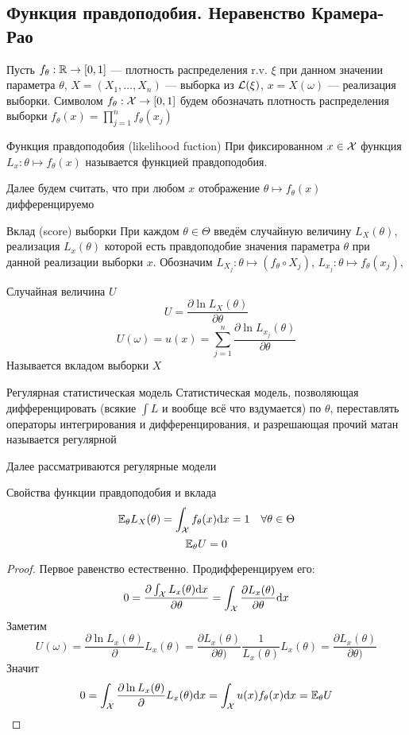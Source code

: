 \subsection{Функция правдоподобия. Неравенство Крамера-Рао}

Пусть $f_\theta:\mathbb R\to\left[{0, 1}\right]$ --- плотность распределения r.v. $\xi$
при данном значении параметра $\theta$,
$X = (X_1, \dotsc, X_n)$ --- выборка из $\mathcal L(\xi)$,
$x = X(\omega)$ --- реализация выборки.
Символом $f_\theta:\mathcal X\to\left[{0, 1}\right]$
будем обозначать плотность распределения выборки
$f_\theta(x) = \prod_{j=1}^n f_\theta(x_j)$

\begin{dfn}{Функция правдоподобия (likelihood fuction)}
При фиксированном $x\in\mathcal X$
функция $L_x: \theta\mapsto f_\theta(x)$ называется функцией правдоподобия.

Далее будем считать,
что при любом $x$
отображение $\theta\mapsto f_\theta(x)$ дифференцируемо
\end{dfn}

\begin{dfn}{Вклад (score) выборки}
При каждом $\theta\in\Theta$
введём случайную величину $L_X(\theta)$,
реализация $L_x(\theta)$ которой
есть правдоподобие значения параметра $\theta$ при данной реализации выборки $x$.
Обозначим
 ${L_{X_j}: \theta\mapsto (f_\theta\circ X_j)}$,
 ${L_{x_j}: \theta\mapsto f_\theta(x_j)}$,

Случайная величина $U$
$$U = \frac{\partial \ln L_X(\theta)}{\partial\theta}$$
$$U(\omega)
= u(x) = \sum_{j=1}^n{\frac{\partial \ln L_{x_j}(\theta)}{\partial\theta}}$$
Называется вкладом выборки $X$
\end{dfn}

\begin{dfn}{Регулярная статистическая модель}
Статистическая модель,
позволяющая
дифференцировать (всякие $\int L$ и вообще всё что вздумается) по $\theta$,
переставлять операторы интегрирования и дифференцирования,
и разрешающая прочий матан называется регулярной

Далее рассматриваются регулярные модели
\end{dfn}

\begin{thm}{Свойства функции правдоподобия и вклада}
$$\mathbb E_\theta L_X(\theta) = \int_\mathcal X f_\theta(x) \mathrm d x = 1 \quad\forall\theta\in\Theta$$
$$\mathbb E_\theta U = 0$$
\end{thm}
\begin{proof}
Первое равенство естественно.
Продифференцируем его:
$$0 = \frac{\partial\int_\mathcal X L_x(\theta) \mathrm d x}{\partial\theta}
= \int_\mathcal X \frac{\partial L_x(\theta)}{\partial\theta} \mathrm d x$$
Заметим
$$U(\omega) = \frac{\partial\ln L_x(\theta)}{\partial} L_x(\theta)
= \frac{\partial L_x(\theta)}{\partial\theta)}\frac{1}{L_x(\theta)} L_x(\theta)
= \frac{\partial L_x(\theta)}{\partial\theta)}$$
Значит
$$0
= \int_\mathcal X \frac{\partial\ln L_x(\theta)}{\partial} L_x(\theta) \mathrm d x
= \int_\mathcal X u(x) f_\theta(x) \mathrm d x
= \mathbb E_\theta U$$
\end{proof}

